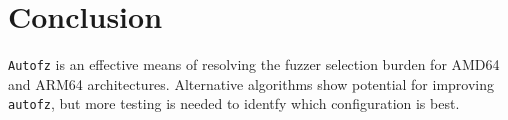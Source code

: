 \section{Conclusion}
\texttt{Autofz} is an effective means of resolving the fuzzer selection burden for AMD64 
and ARM64 architectures. Alternative algorithms show potential for improving 
\texttt{autofz}, but more testing is needed to identfy which configuration is best.